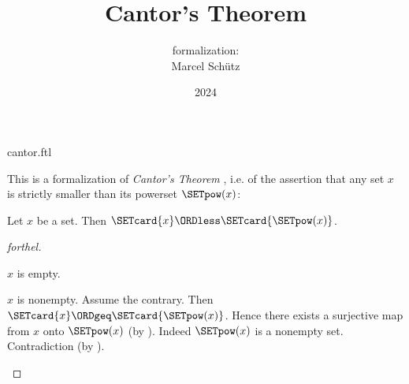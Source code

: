 \documentclass{article}
\title{Cantor's Theorem}
\author{\Naproche formalization: \vspace{0.5em} \\
Marcel Schütz}
\date{2024}
\begin{document}
\begin{smodule}{cantor.ftl}
\maketitle


\noindent This is a formalization of \emph{Cantor's Theorem}
\cite{Cantor1891}, i.e. of the assertion that any set $x$ is strictly smaller
than its powerset $\SETpow(x)$:

\begin{theorem}[forthel,title=Cantor's Theorem,id=cantor_389275382172394]
  Let $x$ be a set.
  Then $\SETcard{x} \ORDless \SETcard{\SETpow(x)}$.
\end{theorem}
\begin{proof}[forthel]
  \begin{case}{$x$ is empty.} \end{case}

  \begin{case}{$x$ is nonempty.}
    Assume the contrary.
    Then $\SETcard{x} \ORDgeq \SETcard{\SETpow(x)}$.
    Hence there exists a surjective map from $x$ onto $\SETpow(x)$ (by ).
    Indeed $\SETpow(x)$ is a nonempty set.
    Contradiction (by ).
  \end{case}
\end{proof}

\printbibliography
{}
\end{smodule}
\end{document}

